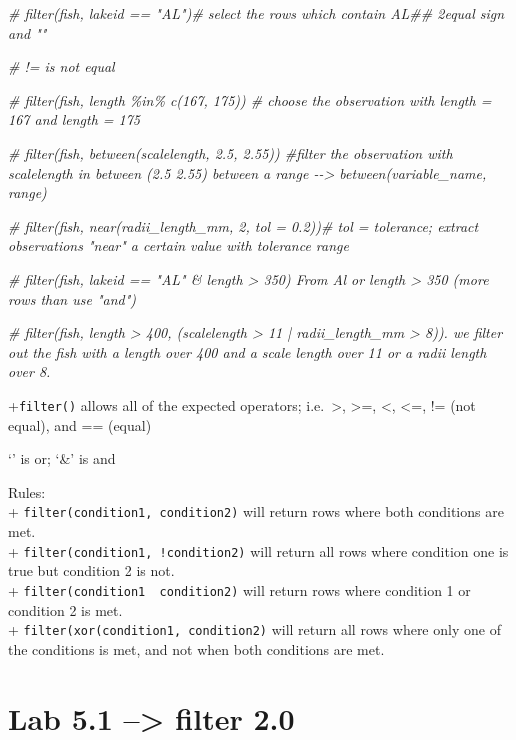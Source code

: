 \documentclass[
]{article}
\newenvironment{Shaded}{\begin{snugshade}}{\end{snugshade}}
\newcommand{\CommentTok}[1]{\textcolor[rgb]{0.56,0.35,0.01}{\textit{#1}}}
\begin{document}
\begin{Shaded}
\begin{Highlighting}[]
\CommentTok{\# filter(fish, lakeid == "AL")\# select the rows which contain AL\#\# 2equal sign and ""}

\CommentTok{\# !=  is not equal }

\CommentTok{\# filter(fish, length \%in\% c(167, 175)) \# choose the observation with length = 167 and length = 175}

\CommentTok{\# filter(fish, between(scalelength, 2.5, 2.55)) \#filter the observation with scalelength in between (2.5 2.55)   between a range {-}{-}\textgreater{} between(variable\_name, range)}

\CommentTok{\# filter(fish, near(radii\_length\_mm, 2, tol = 0.2))\# tol = tolerance; extract observations "near" a certain value with tolerance range}

\CommentTok{\# filter(fish, lakeid == "AL" \& length \textgreater{} 350) From Al or length \textgreater{} 350 (more rows than use "and")}


\CommentTok{\# filter(fish, length \textgreater{} 400, (scalelength \textgreater{} 11 | radii\_length\_mm \textgreater{} 8)). we filter out the fish with a length over 400 and a scale length over 11 or a radii length over 8.}
\end{Highlighting}
\end{Shaded}

+\texttt{filter()} allows all of the expected operators;
i.e.~\textgreater, \textgreater=, \textless, \textless=, != (not equal),
and == (equal)

`\textbar{}' is or; `\&' is and

Rules:\\
+ \texttt{filter(condition1,\ condition2)} will return rows where both
conditions are met.\\
+ \texttt{filter(condition1,\ !condition2)} will return all rows where
condition one is true but condition 2 is not.\\
+ \texttt{filter(condition1\ \textbar{}\ condition2)} will return rows
where condition 1 or condition 2 is met.\\
+ \texttt{filter(xor(condition1,\ condition2)} will return all rows
where only one of the conditions is met, and not when both conditions
are met.

\hypertarget{lab-5.1-filter-2.0}{%
\section{Lab 5.1 --\textgreater{} filter 2.0}\label{lab-5.1-filter-2.0}}
\end{document}
